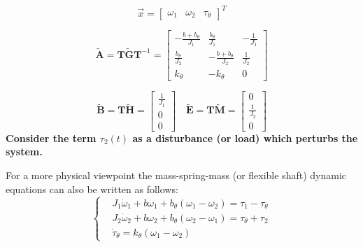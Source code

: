 \documentclass[11pt,a4paper,oneside]{book}
\numberwithin{equation}{section}
\theoremstyle{it}
\theoremstyle{definition}
\begin{document}
\begin{mybox}
	\begin{equation*}
		\vec{x} = \left[\begin{matrix} \omega_1&\omega_2&\tau_{\theta} 
		\end{matrix} \right]^T
	\end{equation*}
	
	\begin{equation*}
		\tilde{\mathbf{A}} = \mathbf{T}\tilde{\mathbf{G}}\mathbf{T}^{-1} =
		\left[ \begin{matrix}
			-\frac{b+b_{\theta}}{J_1} & \frac{b_{\theta}}{J_1} & 
			-\frac{1}{J_1}\\[6pt]
			\frac{b_{\theta}}{J_2} & -\frac{b+b_{\theta}}{J_2} & 
			\frac{1}{J_2}\\[6pt]
			k_{\theta} & -k_{\theta} & 0
		\end{matrix}\right]
	\end{equation*}
	
	\begin{equation*}
		\tilde{\mathbf{B}} = \mathbf{T}\tilde{\mathbf{H}} =
		\left[ \begin{matrix}
			\frac{1}{J_1} \\[6pt]
			0 \\[6pt]
			0
		\end{matrix}\right]
		\quad
		\tilde{\mathbf{E}} = \mathbf{T}\tilde{\mathbf{M}} =
		\left[ \begin{matrix}
			0 \\[6pt]
			\frac{1}{J_2} \\[6pt]
			0
		\end{matrix}\right]
	\end{equation*}
	\textbf{Consider the term $\tau_2(t)$ as a disturbance (or load) which perturbs 
		the system.}
	
	\vspace{5mm}
	For a more physical viewpoint the mass-spring-mass (or flexible shaft) dynamic 
	equations can also be written as follows:
	\begin{equation}
		\left\lbrace 
		\begin{aligned}
			& J_1 \dot{\omega}_1 + b\omega_1+b_{\theta}(\omega_1-\omega_2) = \tau_1 
			- \tau_{\theta} \\[6pt]
			& J_2 \dot{\omega}_2 + b\omega_2+b_{\theta}(\omega_2-\omega_1) = 
			\tau_{\theta} + \tau_2 \\[6pt]
			& \dot{\tau}_{\theta} = k_{\theta}\left( \omega_1-\omega_2\right) 
		\end{aligned}
		\right. 
	\end{equation}
\end{mybox}
\end{document}

